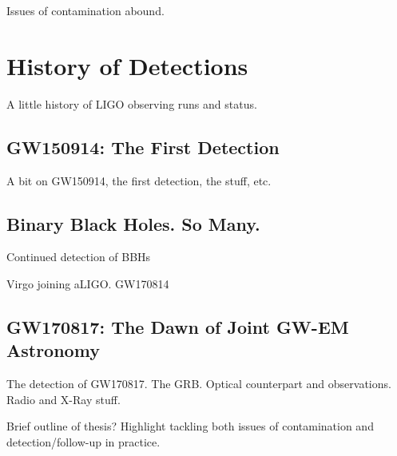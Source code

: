 Issues of contamination abound.

\section{History of Detections}
\label{sec:intro_history}
A little history of LIGO observing runs and status.

\subsection{GW150914: The First Detection}
\label{sec:intro_gw150914}
A bit on GW150914, the first detection, the \fermi  stuff, etc.

\subsection{Binary Black Holes. So Many.}
Continued detection of BBHs

Virgo joining aLIGO. GW170814

\subsection{GW170817: The Dawn of Joint GW-EM Astronomy}
The detection of GW170817. The GRB. Optical counterpart and observations. Radio and X-Ray stuff.

Brief outline of thesis? Highlight tackling both issues of contamination and detection/follow-up in practice.

